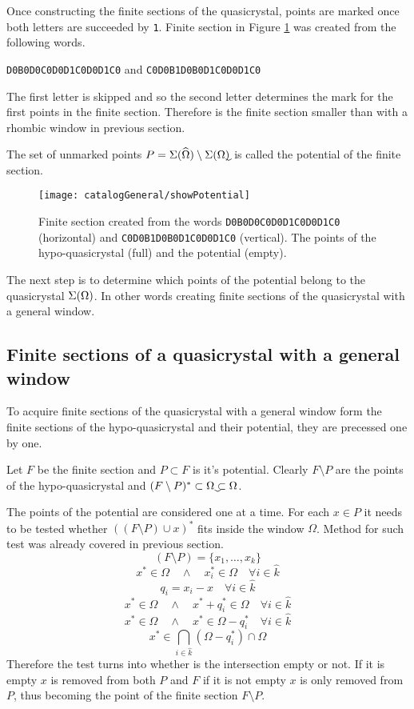 \documentclass[text.tex]{subfiles}
\begin{document}
Once constructing the finite sections of the quasicrystal, points are marked once both letters are succeeded by \texttt{1}. Finite section in Figure \ref{fig:showPotential} was created from the following words.
\begin{center}\texttt{D0B0D0C0D0D1C0D0D1C0} and \texttt{C0D0B1D0B0D1C0D0D1C0}\end{center}
The first letter is skipped and so the second letter determines the mark for the first points in the finite section. Therefore is the finite section smaller than with a rhombic window in previous section. 

The set of unmarked points $P = \quasi{\widehat{\Omega}}\setminus \quasi{\uwidehat{\Omega}}$ is called the potential of the finite section. 

\begin{figure}[h!]
\centering
\texttt{[image: catalogGeneral/showPotential]}
\caption{Finite section created from the words \texttt{D0B0D0C0D0D1C0D0D1C0} (horizontal) and \texttt{C0D0B1D0B0D1C0D0D1C0} (vertical). The points of the hypo-quasicrystal (full) and the potential (empty).}
\label{fig:showPotential}
\end{figure}

The next step is to determine which points of the potential belong to the quasicrystal $\Sigma(\Omega)$. In other words creating finite sections of the quasicrystal with a general window.

\subsection{Finite sections of a quasicrystal with a general window}
To acquire finite sections of the quasicrystal with a general window form the finite sections of the hypo-quasicrystal and their potential, they are precessed one by one. 

Let $F$ be the finite section and $P\subset F$ is it's potential. Clearly $F\setminus P$ are the points of the hypo-quasicrystal and $(F\setminus P)^\ast \subset \uwidehat{\Omega}\subset\Omega$.

The points of the potential are considered one at a time. For each $x\in P$ it needs to be tested whether $((F\setminus P)\cup x)^\ast$ fits inside the window $\Omega$. Method for such test was already covered in previous section.
$$(F\setminus P) = \{x_1,\dots,x_k\}$$
$$x^\ast\in\Omega \quad\wedge\quad x_i^\ast\in\Omega \quad\forall i\in\hat{k}$$
$$q_i = x_i - x \quad\forall i\in\hat{k}$$
$$x^\ast\in\Omega \quad\wedge\quad x^\ast+q_i^\ast\in\Omega \quad\forall i\in\hat{k}$$
$$x^\ast\in\Omega \quad\wedge\quad x^\ast\in\Omega-q_i^\ast \quad\forall i\in\hat{k}$$
$$x^\ast\in\bigcap\limits_{i\in\hat{k}}(\Omega-q_i^\ast)\cap\Omega$$
Therefore the test turns into whether is the intersection empty or not. If it is empty $x$ is removed from both $P$ and $F$ if it is not empty $x$ is only removed from $P$, thus becoming the point of the finite section $F\setminus P$. 
\end{document}
